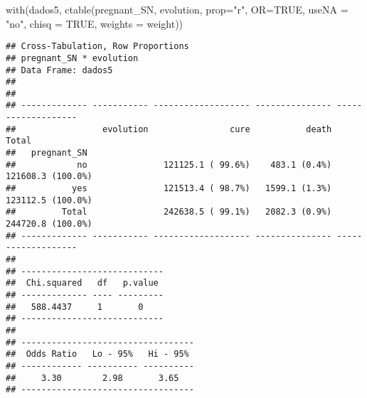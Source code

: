 \documentclass[
]{article}
\newenvironment{Shaded}{\begin{snugshade}}{\end{snugshade}}
\newcommand{\AttributeTok}[1]{\textcolor[rgb]{0.77,0.63,0.00}{#1}}
\newcommand{\ConstantTok}[1]{\textcolor[rgb]{0.00,0.00,0.00}{#1}}
\newcommand{\FunctionTok}[1]{\textcolor[rgb]{0.00,0.00,0.00}{#1}}
\newcommand{\NormalTok}[1]{#1}
\newcommand{\StringTok}[1]{\textcolor[rgb]{0.31,0.60,0.02}{#1}}
\begin{document}
\begin{Shaded}
\begin{Highlighting}[]
\FunctionTok{with}\NormalTok{(dados5, }\FunctionTok{ctable}\NormalTok{(pregnant\_SN, evolution, }\AttributeTok{prop=}\StringTok{"r"}\NormalTok{, }\AttributeTok{OR=}\ConstantTok{TRUE}\NormalTok{, }\AttributeTok{useNA =} \StringTok{"no"}\NormalTok{, }
                    \AttributeTok{chisq =} \ConstantTok{TRUE}\NormalTok{, }\AttributeTok{weights =}\NormalTok{ weight))}
\end{Highlighting}
\end{Shaded}

\begin{verbatim}
## Cross-Tabulation, Row Proportions  
## pregnant_SN * evolution  
## Data Frame: dados5  
## 
## 
## ------------- ----------- ------------------- --------------- -------------------
##                 evolution                cure           death               Total
##   pregnant_SN                                                                    
##            no               121125.1 ( 99.6%)    483.1 (0.4%)   121608.3 (100.0%)
##           yes               121513.4 ( 98.7%)   1599.1 (1.3%)   123112.5 (100.0%)
##         Total               242638.5 ( 99.1%)   2082.3 (0.9%)   244720.8 (100.0%)
## ------------- ----------- ------------------- --------------- -------------------
## 
## ----------------------------
##  Chi.squared   df   p.value 
## ------------- ---- ---------
##   588.4437     1       0    
## ----------------------------
## 
## ----------------------------------
##  Odds Ratio   Lo - 95%   Hi - 95% 
## ------------ ---------- ----------
##     3.30        2.98       3.65   
## ----------------------------------
\end{verbatim}
\end{document}
